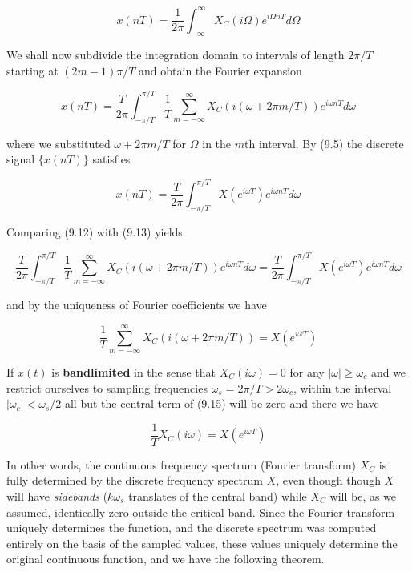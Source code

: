 \begin{equation}
x(nT)=\frac{1}{2\pi}\int_{-\infty}^{\infty}X_C(i\Omega)e^{i\Omega nT}d\Omega
\end{equation}

\noindent
We shall now subdivide the integration domain to intervals of length $2\pi/T$
starting at $(2m-1)\pi/T$ and obtain the Fourier expansion 

\begin{equation}
x(nT)=\frac{T}{2\pi}\int_{-\pi/T}^{\pi/T}\frac{1}{T}\sum_{m=-\infty}^{\infty}
X_C(i(\omega +2\pi m/T))e^{i\omega nT}d\omega
\end{equation}

\noindent
where we substituted $\omega + 2\pi m/T$ for $\Omega$ in the $m$th interval. 
By (9.5) the discrete signal $\{x(nT)\}$ satisfies

\begin{equation}
x(nT)=\frac{T}{2\pi}\int_{-\pi/T}^{\pi/T}X(e^{i\omega T})e^{i\omega nT}d\omega
\end{equation}

\noindent
Comparing (9.12) with (9.13) yields 

\begin{equation}
\frac{T}{2\pi}\int_{-\pi/T}^{\pi/T}\frac{1}{T}\sum_{m=-\infty}^{\infty}
X_C(i(\omega +2\pi m/T))e^{i\omega
  nT}d\omega=\frac{T}{2\pi}\int_{-\pi/T}^{\pi/T}X(e^{i\omega T})e^{i\omega
    nT}d\omega
\end{equation}

\noindent
and by the uniqueness of Fourier coefficients we have 

\begin{equation}
\frac{1}{T}\sum_{m=-\infty}^{\infty} X_C(i(\omega +2\pi m/T)) =X(e^{i\omega T})
\end{equation}



\noindent
If $x(t)$ is {\bf bandlimited} in the sense
that $X_C(i\omega) = 0$ for any $|\omega| \geq \omega_c$ and we restrict
ourselves to sampling frequencies $\omega_s = 2\pi/T > 2\omega_c$, within the
interval $|\omega_c| < \omega_s/2$ all but the central term of (9.15) will be
zero and there we have

\begin{equation}
\frac{1}{T} X_C(i\omega) =X(e^{i\omega T})
\end{equation}

\noindent
In other words, the continuous frequency spectrum (Fourier transform) $X_C$ is
fully determined by the discrete frequency spectrum $X$, even though though
$X$ will have {\it sidebands} ($k\omega_s$ translates of the
central band) while $X_C$ will be, as we assumed, identically zero outside the
critical band. Since the Fourier transform uniquely determines the function,
and the discrete spectrum was computed entirely on the basis of the sampled
values, these values uniquely determine the original continuous function, and
we have the following theorem.

